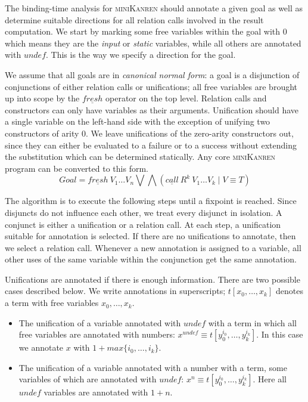 \documentclass[submission,copyright,creativecommons]{eptcs}
\newcommand{\miniKanren}{\textsc{miniKanren}}
\begin{document}
The binding-time analysis for \miniKanren{} should annotate a given goal as well as determine suitable directions for all relation calls involved in the result computation.
We start by marking some free variables within the goal with $0$ which means they are the \emph{input} or \emph{static} variables, while all others are annotated with $undef$.
This is the way we specify a direction for the goal.

We assume that all goals are in \emph{canonical normal form}: a goal is a disjunction of conjunctions of either relation calls or unifications; all free variables are brought up into scope by the $\underline{fresh}$ operator on the top level. Relation calls and constructors can only have variables as their arguments. Unification should have a single variable on the left-hand side with the exception of unifying two constructors of arity $0$.
We leave unifications of the zero-arity constructors out, since they can either be evaluated to a failure or to a success without extending the substitution which can be determined statically.
Any core \miniKanren{} program can be converted to this form.
$$Goal = \underline{fresh} \ V_1 \dots V_n \bigvee \bigwedge (\underline{call} \ R^k \ V_1 \dots V_k \mid V \equiv T)$$

The algorithm is to execute the following steps until a fixpoint is reached.
Since disjuncts do not influence each other, we treat every disjunct in isolation.
A conjunct is either a unification or a relation call.
At each step, a unification suitable for annotation is selected.
If there are no unifications to annotate, then we select a relation call.
Whenever a new annotation is assigned to a variable, all other uses of the same variable within the conjunction get the same annotation.

Unifications are annotated if there is enough information.
There are two possible cases described below.
We write annotations in superscripts; $t[x_0, \dots, x_k]$ denotes a term with free variables $x_0, \dots, x_k$.
\begin{itemize}
  \item The unification of a variable annotated with $undef$ with a term in which all free variables are annotated with numbers: $x^{undef} \equiv t[y_0^{i_0},\dots, y_k^{i_k}]$. In this case we annotate $x$ with $1+max\{i_0,\dots,i_k\}$.
  \item The unification of a variable annotated with a number with a term, some variables of which are annotated with $undef$: $x^{n} \equiv t[y_0^{i_0},\dots, y_k^{i_k}]$. Here all $undef$ variables are annotated with $1+n$.
\end{itemize}
\end{document}
